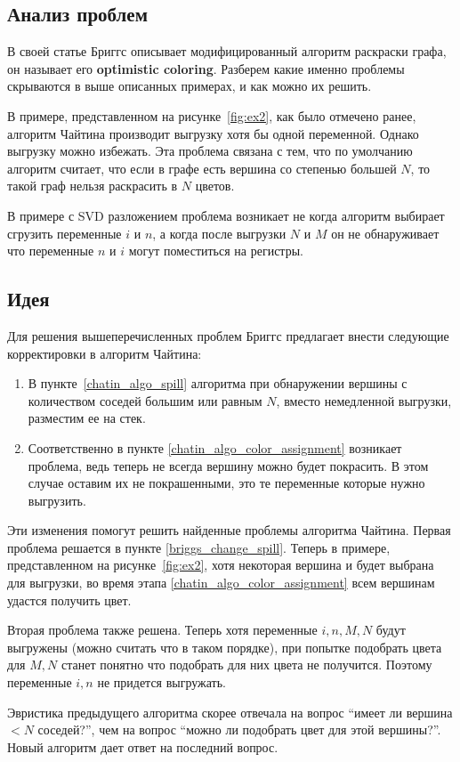 \subsection{Анализ проблем}

В своей статье Бриггс описывает модифицированный алгоритм раскраски графа, он называет его \textbf{optimistic coloring}.
Разберем какие именно проблемы скрываются в выше описанных примерах, и как можно их решить.

В примере, представленном на рисунке~\ref{fig:ex2}, как было отмечено ранее, алгоритм Чайтина производит выгрузку хотя бы одной переменной.
Однако выгрузку можно избежать.
Эта проблема связана с тем, что по умолчанию алгоритм считает, что если в графе есть вершина со степенью большей $N$,
то такой граф нельзя раскрасить в $N$ цветов.

В примере с SVD разложением проблема возникает не когда алгоритм выбирает сгрузить переменные $i$ и $n$, а когда
после выгрузки $N$ и $M$ он не обнаруживает что переменные $n$ и $i$ могут поместиться на регистры.

\subsection{Идея}

Для решения вышеперечисленных проблем Бриггс предлагает внести следующие корректировки в алгоритм Чайтина:

\begin{enumerate}
    \item В пункте~\ref{chatin_algo_spill} алгоритма при обнаружении вершины с количеством соседей большим или равным $N$,
    вместо немедленной выгрузки, разместим ее на стек. \label{briggs_change_spill}

    \item Соответственно в пункте \ref{chatin_algo_color_assignment} возникает проблема, ведь теперь не всегда
    вершину можно будет покрасить. В этом случае оставим их не покрашенными, это те переменные которые нужно
    выгрузить.
    
\end{enumerate}

Эти изменения помогут решить найденные проблемы алгоритма Чайтина. Первая проблема решается в пункте \ref{briggs_change_spill}.
Теперь в примере, представленном на рисунке~\ref{fig:ex2}, хотя некоторая вершина и будет выбрана для выгрузки, во время этапа \ref{chatin_algo_color_assignment}
всем вершинам удастся получить цвет.

Вторая проблема также решена. Теперь хотя переменные $i, n, M, N$ будут выгружены (можно считать что в таком
порядке), при попытке подобрать цвета для $M, N$ станет понятно что подобрать для них цвета не получится.
Поэтому переменные $i, n$ не придется выгружать.

Эвристика предыдущего алгоритма скорее отвечала на
вопрос ``имеет ли вершина $< N$ соседей?'', чем на вопрос ``можно ли подобрать цвет для этой вершины?''. Новый
алгоритм дает ответ на последний вопрос.
